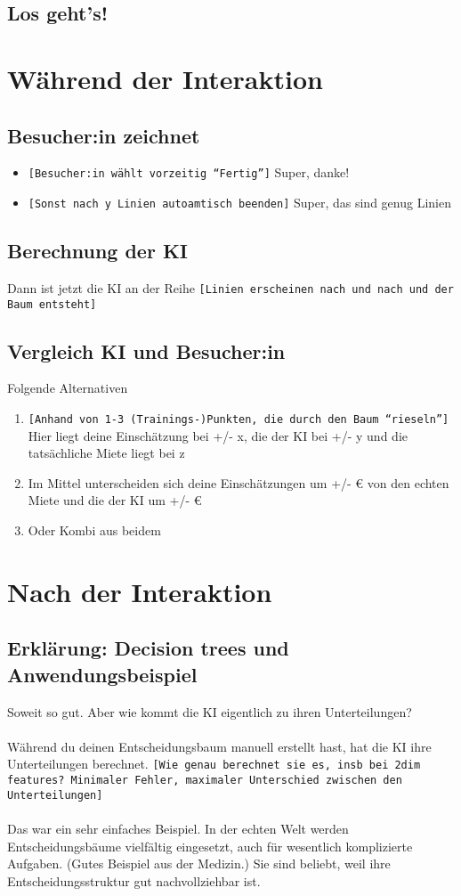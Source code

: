 \documentclass[12pt]{article}
\begin{document}
\subsection{Los geht's!}

\section{Während der Interaktion}
\subsection{Besucher:in zeichnet}
\begin{itemize}
    \item \texttt{[Besucher:in wählt vorzeitig ``Fertig'']} Super, danke!
    \item \texttt{[Sonst nach y Linien autoamtisch beenden]} Super, das sind genug Linien
\end{itemize}

\subsection{Berechnung der KI}
Dann ist jetzt die KI an der Reihe \texttt{[Linien erscheinen nach und nach und der Baum entsteht]}

\subsection{Vergleich KI und Besucher:in}
Folgende Alternativen
\begin{enumerate}
    \item \texttt{[Anhand von 1-3 (Trainings-)Punkten, die durch den Baum ``rieseln'']} Hier liegt deine Einschätzung bei +/- x, die der KI bei +/- y und die tatsächliche Miete liegt bei z
    \item Im Mittel unterscheiden sich deine Einschätzungen um +/- \euro{} von den echten Miete und die der KI um +/- \euro{}
    \item Oder Kombi aus beidem
\end{enumerate}

\section{Nach der Interaktion}
\subsection{Erklärung: Decision trees und Anwendungsbeispiel}
Soweit so gut. Aber wie kommt die KI eigentlich zu ihren Unterteilungen?\\
\\
Während du deinen Entscheidungsbaum manuell erstellt hast, hat die KI ihre Unterteilungen berechnet. \texttt{[Wie genau berechnet sie es, insb bei 2dim features? Minimaler Fehler, maximaler Unterschied zwischen den Unterteilungen]}\\
\\
Das war ein sehr einfaches Beispiel. In der echten Welt werden Entscheidungsbäume vielfältig eingesetzt, auch für wesentlich komplizierte Aufgaben. (Gutes Beispiel aus der Medizin.) Sie sind beliebt, weil ihre Entscheidungsstruktur gut nachvollziehbar ist.
\end{document}
